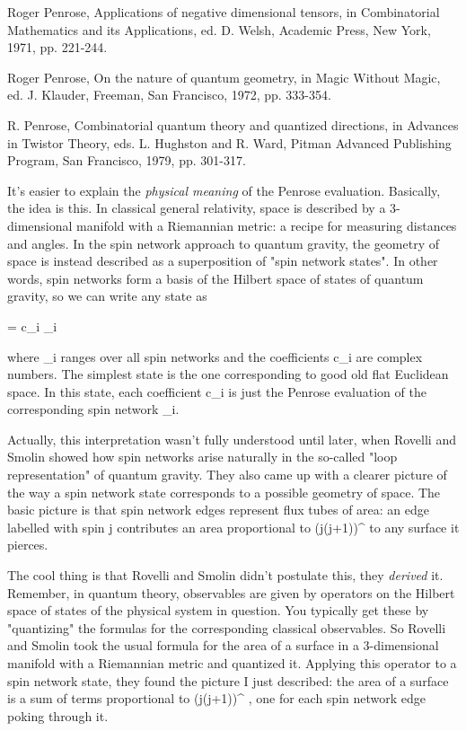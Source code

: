 Roger Penrose, Applications of negative dimensional tensors, in 
Combinatorial Mathematics and its Applications, ed. D. Welsh,
Academic Press, New York, 1971, pp. 221-244.

Roger Penrose, On the nature of quantum geometry, in Magic Without
Magic, ed. J. Klauder, Freeman, San Francisco, 1972, pp. 333-354.

R. Penrose, Combinatorial quantum theory and quantized directions, in
Advances in Twistor Theory, eds. L. Hughston and R. Ward,
Pitman Advanced Publishing Program, San Francisco, 1979, pp. 301-317.



It's easier to explain the \emph{physical meaning} of the Penrose evaluation.
Basically, the idea is this.  In classical general relativity, space is
described by a 3-dimensional manifold with a Riemannian metric: a recipe
for measuring distances and angles.  In the spin network approach to
quantum gravity, the geometry of space is instead described as a
superposition of "spin network states".  In other words, spin networks
form a basis of the Hilbert space of states of quantum gravity, so we
can write any state \Psi  as

                         \Psi  = \sum c_{i} \psi _{i}

where \psi _{i} ranges over all spin networks and the
coefficients c_{i} are complex numbers.  The simplest state is
the one corresponding to good old flat Euclidean space.  In this state,
each coefficient c_{i} is just the Penrose evaluation of the 
corresponding spin network \psi _{i}.

Actually, this interpretation wasn't fully understood until later, when
Rovelli and Smolin showed how spin networks arise naturally in the
so-called "loop representation" of quantum gravity.  They also came up
with a clearer picture of the way a spin network state corresponds to a
possible geometry of space.  The basic picture is that spin network
edges represent flux tubes of area: an edge labelled with spin j
contributes an area proportional to (j(j+1))^{ } to any surface it
pierces.  

The cool thing is that Rovelli and Smolin didn't postulate this, they
\emph{derived} it.  Remember, in quantum theory, observables are given by
operators on the Hilbert space of states of the physical system in
question.  You typically get these by "quantizing" the formulas for the
corresponding classical observables.  So Rovelli and Smolin took the
usual formula for the area of a surface in a 3-dimensional manifold with
a Riemannian metric and quantized it.  Applying this operator to a spin
network state, they found the picture I just described: the area of a
surface is a sum of terms proportional to (j(j+1))^{ }, 
one for each
spin network edge poking through it.

